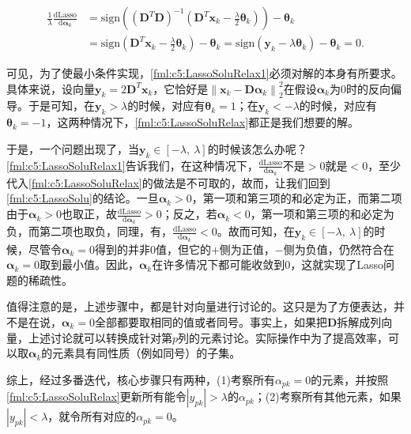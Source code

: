 \begin{equation}\label{fml:c5:LassoSoluRelax1}
	\begin{aligned}
		\frac{1}{\lambda}\frac{\mathrm{d} \mathrm{Lasso}}{\mathrm{d}\bm{\alpha}_k} &=  \mathrm{sign}\left((\mathbf{D}^T\mathbf{D})^{-1}(\mathbf{D}^T\mathbf{x}_k-\frac{\lambda}{2}\bm{\theta}_k)\right) - \bm{\theta}_k \\
		&= \mathrm{sign}\left(\mathbf{D}^T\mathbf{x}_k-\frac{\lambda}{2}\bm{\theta}_k\right) - \bm{\theta}_k = \mathrm{sign}\left(\mathbf{y}_k-\lambda\bm{\theta}_k\right) - \bm{\theta}_k = 0.
	\end{aligned}
\end{equation}

可见，为了使最小条件实现，\eqref{fml:c5:LassoSoluRelax1}必须对解的本身有所要求。具体来说，设向量$\mathbf{y}_k=2\mathbf{D}^T\mathbf{x}_k$，它恰好是${\lVert \mathbf{x}_k - \mathbf{D}\bm{\alpha}_k \rVert}_2^2$在假设$\bm{\alpha}_k$为0时的反向偏导。于是可知，在$\mathbf{y}_k>\lambda$的时候，对应有$\bm{\theta}_k=1$；在$\mathbf{y}_k<-\lambda$的时候，对应有$\bm{\theta}_k=-1$，这两种情况下，\eqref{fml:c5:LassoSoluRelax}都正是我们想要的解。

于是，一个问题出现了，当$\mathbf{y}_k \in [-\lambda,~\lambda]$的时候该怎么办呢？\eqref{fml:c5:LassoSoluRelax1}告诉我们，在这种情况下，$\frac{\mathrm{d} \mathrm{Lasso}}{\mathrm{d}\bm{\alpha}_k}$不是$>0$就是$<0$，至少代入\eqref{fml:c5:LassoSoluRelax}的做法是不可取的，故而，让我们回到\eqref{fml:c5:LassoSolu}的结论。一旦$\bm{\alpha}_{k}>0$，第一项和第三项的和必定为正，而第二项由于$\bm{\alpha}_{k}>0$也取正，故$\frac{\mathrm{d} \mathrm{Lasso}}{\mathrm{d} \bm{\alpha}_{k}}>0$；反之，若$\bm{\alpha}_{k}<0$，第一项和第三项的和必定为负，而第二项也取负，同理，有，$\frac{\mathrm{d} \mathrm{Lasso}}{\mathrm{d} \bm{\alpha}_{k}}<0$。故而可知，在$\mathbf{y}_k \in [-\lambda,~\lambda]$的时候，尽管令$\bm{\alpha}_{k}=0$得到的并非0值，但它的$+$侧为正值，$-$侧为负值，仍然符合在$\bm{\alpha}_{k}=0$取到最小值。因此，$\bm{\alpha}_{k}$在许多情况下都可能收敛到0，这就实现了Lasso问题的稀疏性。

值得注意的是，上述步骤中，都是针对向量进行讨论的。这只是为了方便表达，并不是在说，$\bm{\alpha}_{k}=0$全部都要取相同的值或者同号。事实上，如果把$\mathbf{D}$拆解成列向量，上述讨论就可以转换成针对第$p$列的元素讨论。实际操作中为了提高效率，可以取$\bm{\alpha}_{k}$的元素具有同性质（例如同号）的子集。

综上，经过多番迭代，核心步骤只有两种，(1)考察所有$\alpha_{pk}=0$的元素，并按照\eqref{fml:c5:LassoSoluRelax}更新所有能令$|y_{pk}|>\lambda$的$\alpha_{pk}$；(2)考察所有其他元素，如果$|y_{pk}|<\lambda$，就令所有对应的$\alpha_{pk}=0$。


